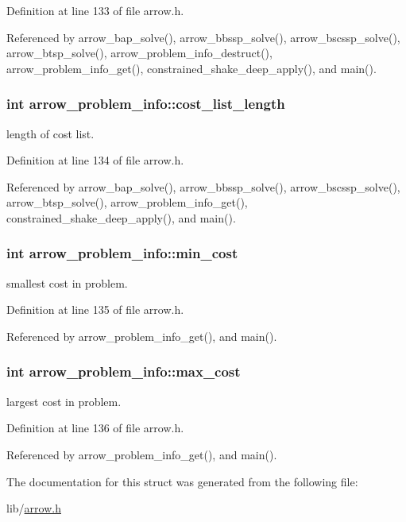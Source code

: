 Definition at line 133 of file arrow.h.

Referenced by arrow\_\-bap\_\-solve(), arrow\_\-bbssp\_\-solve(), arrow\_\-bscssp\_\-solve(), arrow\_\-btsp\_\-solve(), arrow\_\-problem\_\-info\_\-destruct(), arrow\_\-problem\_\-info\_\-get(), constrained\_\-shake\_\-deep\_\-apply(), and main().\hypertarget{structarrow__problem__info_54bbdc187af19361072480b45016f171}{
\subsubsection{\setlength{\rightskip}{0pt plus 5cm}int {\bf arrow\_\-problem\_\-info::cost\_\-list\_\-length}}}
\label{structarrow__problem__info_54bbdc187af19361072480b45016f171}


length of cost list. 

Definition at line 134 of file arrow.h.

Referenced by arrow\_\-bap\_\-solve(), arrow\_\-bbssp\_\-solve(), arrow\_\-bscssp\_\-solve(), arrow\_\-btsp\_\-solve(), arrow\_\-problem\_\-info\_\-get(), constrained\_\-shake\_\-deep\_\-apply(), and main().\hypertarget{structarrow__problem__info_46fabcc0ccd3a732cebb014331d4eeb5}{
\subsubsection{\setlength{\rightskip}{0pt plus 5cm}int {\bf arrow\_\-problem\_\-info::min\_\-cost}}}
\label{structarrow__problem__info_46fabcc0ccd3a732cebb014331d4eeb5}


smallest cost in problem. 

Definition at line 135 of file arrow.h.

Referenced by arrow\_\-problem\_\-info\_\-get(), and main().\hypertarget{structarrow__problem__info_724060f3be25521cca761899913c2776}{
\subsubsection{\setlength{\rightskip}{0pt plus 5cm}int {\bf arrow\_\-problem\_\-info::max\_\-cost}}}
\label{structarrow__problem__info_724060f3be25521cca761899913c2776}


largest cost in problem. 

Definition at line 136 of file arrow.h.

Referenced by arrow\_\-problem\_\-info\_\-get(), and main().

The documentation for this struct was generated from the following file:\begin{CompactItemize}
\item 
lib/\hyperlink{arrow_8h}{arrow.h}\end{CompactItemize}
